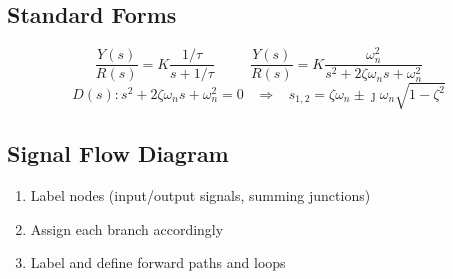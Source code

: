 \documentclass[twocolumn, 12pt]{article}    %
\begin{document}
\subsection*{Standard Forms}
\begin{equation*}
    \frac{Y(s)}{R(s)} = K\frac{1/\tau}{s + 1/\tau} \hspace{30pt} \frac{Y(s)}{R(s)} = K\frac{\omega_n^2}{s^2+2\zeta\omega_ns+\omega_n^2}
\end{equation*}
\begin{equation*}
    D(s): s^2+2\zeta\omega_ns+\omega_n^2 =0 \hspace{10pt} \Longrightarrow \hspace{10pt} s_{1,2} = \zeta\omega_n \pm\jmath \omega_n\sqrt{1-\zeta^2}
\end{equation*}



\subsection*{Signal Flow Diagram}
\begin{enumerate}
    \item Label nodes (input/output signals, summing junctions)
    \item Assign each branch accordingly
    \item Label and define forward paths and loops
\end{enumerate}
\end{document}
